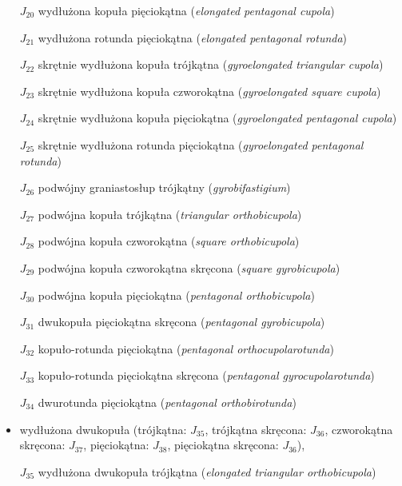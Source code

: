 \begin{itemize}
    \item [$J_{20}$] {wydłużona kopuła pięciokątna}
                     (\emph{elongated pentagonal cupola})
    \item [$J_{21}$] {wydłużona rotunda pięciokątna}
                     (\emph{elongated pentagonal rotunda})
    \item [$J_{22}$] {skrętnie wydłużona kopuła trójkątna}
                     (\emph{gyroelongated triangular cupola})
    \item [$J_{23}$] {skrętnie wydłużona kopuła czworokątna}
                     (\emph{gyroelongated square cupola})
    \item [$J_{24}$] {skrętnie wydłużona kopuła pięciokątna}
                     (\emph{gyroelongated pentagonal cupola})
    \item [$J_{25}$] {skrętnie wydłużona rotunda pięciokątna}
                     (\emph{gyroelongated pentagonal rotunda})
    \item [$J_{26}$] {podwójny graniastosłup trójkątny}
                     (\emph{gyrobifastigium})
    \item [$J_{27}$] {podwójna kopuła trójkątna}
                     (\emph{triangular orthobicupola})
    \item [$J_{28}$] {podwójna kopuła czworokątna}
                     (\emph{square orthobicupola})
    \item [$J_{29}$] {podwójna kopuła czworokątna skręcona}
                     (\emph{square gyrobicupola})
    \item [$J_{30}$] {podwójna kopuła pięciokątna}
                     (\emph{pentagonal orthobicupola})
    \item [$J_{31}$] {dwukopuła pięciokątna skręcona}
                     (\emph{pentagonal gyrobicupola})
    \item [$J_{32}$] {kopuło-rotunda pięciokątna}
                     (\emph{pentagonal orthocupolarotunda})
    \item [$J_{33}$] {kopuło-rotunda pięciokątna skręcona}
                     (\emph{pentagonal gyrocupolarotunda})
    \item [$J_{34}$] {dwurotunda pięciokątna}
                     (\emph{pentagonal orthobirotunda})
    \item wydłużona dwukopuła (trójkątna: $J_{35}$, trójkątna skręcona: $J_{36}$, czworokątna skręcona: $J_{37}$, pięciokątna: $J_{38}$, pięciokątna skręcona: $J_{36}$),
    \item [$J_{35}$] {wydłużona dwukopuła trójkątna}
                     (\emph{elongated triangular orthobicupola})

\end{itemize}

